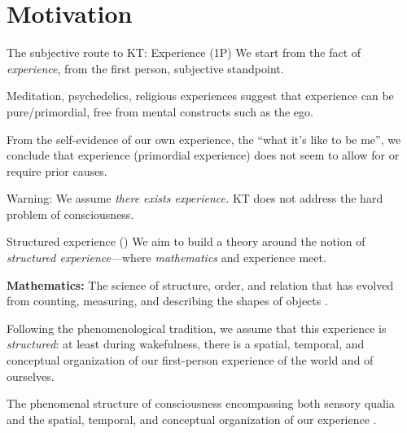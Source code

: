 




\section{Motivation}


\begin{frame}[label=intro]{The subjective route to KT: Experience (1P)}
	We start from the fact of {\em experience}, from the first person, subjective standpoint.  \vfill
	
	Meditation, psychedelics, religious experiences suggest that experience can be pure/primordial, free from mental constructs such as the ego.\vfill
	
	From the self-evidence of our own experience, the ``what it's like to be me'', we conclude that experience (primordial experience) does not seem to allow for or require prior causes.\vfill
	
    \begin{alertblock}{Warning:  We assume {\em there exists experience.} } 
	KT does not address the hard problem of consciousness.  
	\end{alertblock}
	

\end{frame}

\begin{frame}[label=intro2]{Structured experience (\SEP)}
 We aim to build a theory around the notion of 
{\em structured experience}---where {\em mathematics} and experience meet.  \vfill

{\bf Mathematics:}  The science of structure, order, and relation that has evolved from counting, measuring, and describing the shapes of objects \citep{gray_2010}.  \vfill

Following the phenomenological tradition, we assume that this experience is {\em structured}: at least during wakefulness, there is a spatial, temporal, and conceptual organization of our first-person experience of the world and of ourselves. \vfill

	\begin{definition}
The phenomenal structure of consciousness  encompassing both sensory qualia and the spatial, temporal, and conceptual organization of our experience  \citep{VanGulick:2016aa}. 
	\end{definition}

	

\end{frame}


